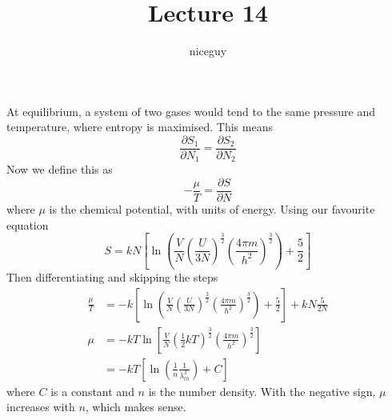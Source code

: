 \documentclass[12pt]{article}
\author{niceguy}
\title{Lecture 14}
\begin{document}
\maketitle

At equilibrium, a system of two gases would tend to the same pressure and temperature, where entropy is maximised. This means
$$\frac{\partial S_1}{\partial N_1} = \frac{\partial S_2}{\partial N_2}$$
Now we define this as
$$-\frac{\mu}{T} = \frac{\partial S}{\partial N}$$
where $\mu$ is the chemical potential, with units of energy. Using our favourite equation
$$S = kN\left[\ln\left(\frac{V}{N}\left(\frac{U}{3N}\right)^{\frac{3}{2}}\left(\frac{4\pi m}{h^2}\right)^{\frac{3}{2}}\right) + \frac{5}{2}\right]$$
Then differentiating and skipping the steps
\begin{align*}
    \frac{\mu}{T} &= -k\left[\ln\left(\frac{V}{N}\left(\frac{U}{3N}\right)^{\frac{3}{2}}\left(\frac{4\pi m}{h^2}\right)^{\frac{3}{2}}\right) + \frac{5}{2}\right] + kN\frac{5}{2N} \\
    \mu &= -kT\ln\left[\frac{V}{N}\left(\frac{1}{2}kT\right)^{\frac{3}{2}}\left(\frac{4\pi m}{h^2}\right)^{\frac{3}{2}}\right] \\
        &= -kT\left[\ln\left(\frac{1}{n} \frac{1}{\lambda_{th}^3}\right) + C\right]
\end{align*}
where $C$ is a constant and $n$ is the number density. With the negative sign, $\mu$ increases with $n$, which makes sense.
\end{document}
